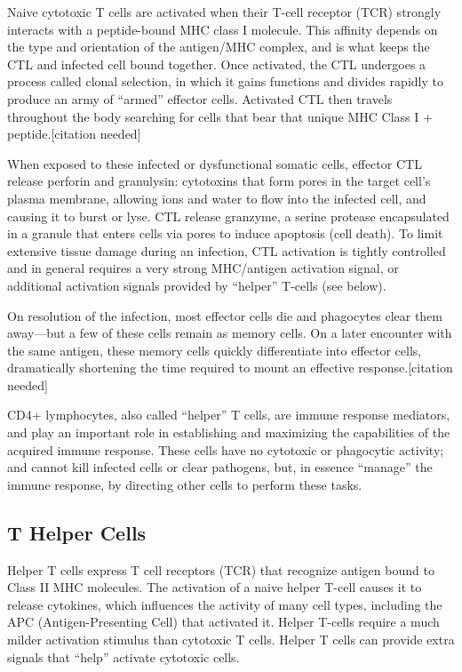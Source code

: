 Naive cytotoxic T cells are activated when their T-cell receptor (TCR) strongly interacts with a peptide-bound MHC class I molecule. This affinity depends on the type and orientation of the antigen/MHC complex, and is what keeps the CTL and infected cell bound together. Once activated, the CTL undergoes a process called clonal selection, in which it gains functions and divides rapidly to produce an army of ``armed'' effector cells. Activated CTL then travels throughout the body searching for cells that bear that unique MHC Class I + peptide.{[}citation needed{]}

When exposed to these infected or dysfunctional somatic cells, effector CTL release perforin and granulysin: cytotoxins that form pores in the target cell's plasma membrane, allowing ions and water to flow into the infected cell, and causing it to burst or lyse. CTL release granzyme, a serine protease encapsulated in a granule that enters cells via pores to induce apoptosis (cell death). To limit extensive tissue damage during an infection, CTL activation is tightly controlled and in general requires a very strong MHC/antigen activation signal, or additional activation signals provided by ``helper'' T-cells (see below).

On resolution of the infection, most effector cells die and phagocytes clear them away---but a few of these cells remain as memory cells. On a later encounter with the same antigen, these memory cells quickly differentiate into effector cells, dramatically shortening the time required to mount an effective response.{[}citation needed{]}

CD4+ lymphocytes, also called ``helper'' T cells, are immune response mediators, and play an important role in establishing and maximizing the capabilities of the acquired immune response. These cells have no cytotoxic or phagocytic activity; and cannot kill infected cells or clear pathogens, but, in essence ``manage'' the immune response, by directing other cells to perform these tasks.

\hypertarget{t-helper-cells}{%
\subsection{T Helper Cells}\label{t-helper-cells}}

Helper T cells express T cell receptors (TCR) that recognize antigen bound to Class II MHC molecules. The activation of a naive helper T-cell causes it to release cytokines, which influences the activity of many cell types, including the APC (Antigen-Presenting Cell) that activated it. Helper T-cells require a much milder activation stimulus than cytotoxic T cells. Helper T cells can provide extra signals that ``help'' activate cytotoxic cells.

